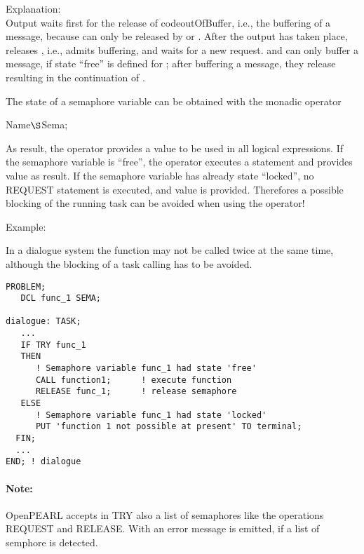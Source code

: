 Explanation:\\
Output waits first for the release of code{outOfBuffer}, i.e., the
buffering of a message, because  can only be released by
 or .
After the output has taken place, 
releases , i.e., admits buffering, and waits for a new
request.  and  can only buffer a message, if state
``free'' is defined for ; after buffering a message, they
release  resulting in the continuation of .

The state of a semaphore variable can be obtained with the monadic
operator

 Name$\S $Sema;

As result, the operator provides a  value to be used in all
logical expressions. If the semaphore variable is ``free'', the operator
executes a  statement and provides value  as result. If the
semaphore variable has already state ``locked'', no REQUEST statement
is executed, and value  is provided. Therefores a possible blocking 
of the running task can be avoided when using the  operator!

Example:

In a dialogue system the function 
 may not be called twice at the same time, although the
blocking of a task calling  has to be avoided.

\begin{lstlisting}
PROBLEM;
   DCL func_1 SEMA; 

dialogue: TASK;
   ...
   IF TRY func_1
   THEN
      ! Semaphore variable func_1 had state 'free' 
      CALL function1;      ! execute function
      RELEASE func_1;      ! release semaphore 
   ELSE
      ! Semaphore variable func_1 had state 'locked'
      PUT 'function 1 not possible at present' TO terminal;
  FIN;
  ...
END; ! dialogue 
\end{lstlisting}

\paragraph{Note:} OpenPEARL accepts in TRY also a list of semaphores like the operations 
REQUEST and RELEASE. 
With  an error message is emitted, if a list of semphore is detected.

